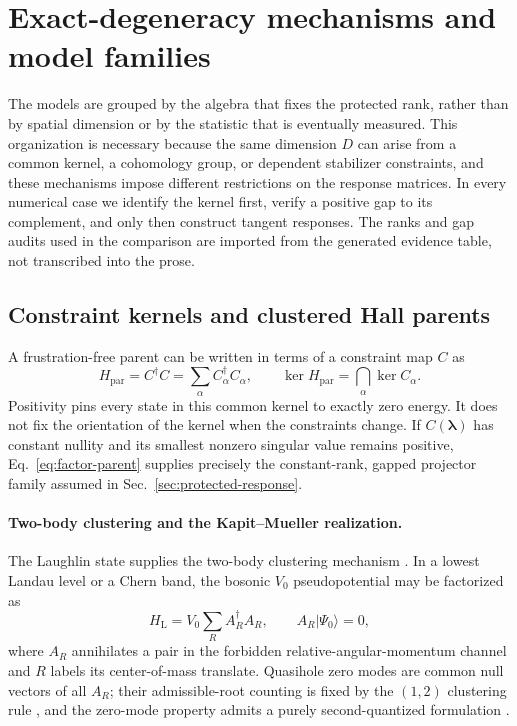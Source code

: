 \section{Exact-degeneracy mechanisms and model families}
\label{sec:models}

The models are grouped by the algebra that fixes the protected rank, rather
than by spatial dimension or by the statistic that is eventually measured.
This organization is necessary because the same dimension $D$ can arise from
a common kernel, a cohomology group, or dependent stabilizer constraints, and
these mechanisms impose different restrictions on the response matrices.  In
every numerical case we identify the kernel first, verify a positive gap to
its complement, and only then construct tangent responses.  The ranks and gap
audits used in the comparison are imported from the generated evidence table,
not transcribed into the prose.

\subsection{Constraint kernels and clustered Hall parents}

A frustration-free parent can be written in terms of a constraint map $C$
as
\begin{equation}
 H_{\mathrm{par}}=C^\dagger C
 =\sum_\alpha C_\alpha^\dagger C_\alpha,
 \qquad
 \ker H_{\mathrm{par}}=\bigcap_\alpha\ker C_\alpha.
 \label{eq:factor-parent}
\end{equation}
Positivity pins every state in this common kernel to exactly zero energy.  It
does not fix the orientation of the kernel when the constraints change.  If
$C(\boldsymbol\lambda)$ has constant nullity and its smallest nonzero singular
value remains positive, Eq.~\eqref{eq:factor-parent} supplies precisely the
constant-rank, gapped projector family assumed in Sec.~\ref{sec:protected-response}.

\paragraph*{Two-body clustering and the Kapit--Mueller realization.}
The Laughlin state supplies the two-body clustering mechanism
\cite{laughlin1983}.  In a lowest Landau level or a Chern band, the bosonic
$V_0$ pseudopotential may be factorized as
\begin{equation}
 H_{\mathrm L}=V_0\sum_R A_R^\dagger A_R,
 \qquad
 A_R|\Psi_0\rangle=0,
 \label{eq:laughlin-parent}
\end{equation}
where $A_R$ annihilates a pair in the forbidden relative-angular-momentum
channel and $R$ labels its center-of-mass translate.  Quasihole zero modes are
common null vectors of all $A_R$; their admissible-root counting is fixed by
the $(1,2)$ clustering rule \cite{bernevighaldane2008}, and the zero-mode
property admits a purely second-quantized formulation \cite{chenseidel2015}.

